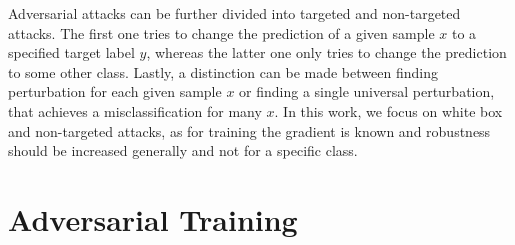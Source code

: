 \documentclass{article}
\begin{document}
Adversarial attacks can be further divided into targeted and non-targeted attacks. The first one tries to change the prediction of a given sample $x$ to a specified target label $y$, whereas the latter one only tries to change the prediction to some other class. Lastly, a distinction can be made between finding perturbation for each given sample $x$ or finding a single universal perturbation, that achieves a misclassification for many $x$. In this work, we focus on white box and non-targeted attacks, as for training the gradient is known and robustness should be increased generally and not for a specific class. 
  
\section{Adversarial Training}
  
\end{document}
